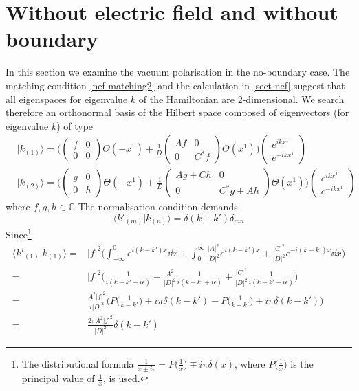 \section{Without electric field and without boundary}
In this section we examine the vacuum polarisation in the no-boundary case.
The matching condition \cref{nef-matching2} and the calculation in \cref{sect-nef} suggest that all eigenspaces for eigenvalue $k$ of the Hamiltonian are 2-dimensional. We search therefore an orthonormal basis of the Hilbert space composed of eigenvectors (for eigenvalue $k$) of type
\begin{equation}
\begin{split}
& | k_{(1)} \rangle = \bigg( \begin{pmatrix} f & 0 \\ 0 & 0 \end{pmatrix}
\Theta(-x^1) + 
\frac{1}{D}\begin{pmatrix} Af & 0 \\  0 & C^* f \end{pmatrix} \Theta(x^1) \bigg)
\begin{pmatrix} e^{ikx^1}  \\ e^{-ikx^1} \end{pmatrix}   \\
& | k_{(2)} \rangle = \bigg( \begin{pmatrix} g& 0 \\ 0 & h \end{pmatrix}
\Theta(-x^1) + 
\frac{1}{D}\begin{pmatrix} Ag + Ch  & 0\\ 0&  C^*g + Ah  \end{pmatrix} \Theta(x^1) \bigg)
\begin{pmatrix} e^{ikx^1}  \\  e^{-ikx^1}  \end{pmatrix}  
\end{split}
\end{equation}
where $f,g,h \in \mathbb{C}$
The normalisation condition demands
\begin{equation}
\langle k'_{(m)} | k_{(n)} \rangle = \delta(k - k') \delta_{mn}
\end{equation}
Since\footnote{
The distributional formula $\frac{1}{x \pm i\epsilon} = P\big(\frac{1}{x}\big) \mp i\pi\delta(x)$, where $P\big(\frac{1}{x}\big)$ is the principal value of $\frac{1}{x}$, is used.}
\begin{equation}
\begin{split}
\langle k'_{(1)} | k_{(1)} \rangle = & |f|^2 \bigg( \int_{-\infty}^0 e^{i(k - k')x} \dd x + \int_0^{\infty}\frac{|A|^2}{|D|^2} e^{i(k-k')x} + \frac{|C|^2}{|D|^2} e^{-i(k - k')x} \dd x \bigg) \\
= & |f|^2 \bigg( \frac{1}{i(k-k' - i\epsilon)} - \frac{A^2}{|D|^2}\frac{1}{i(k-k'+i\epsilon)} + \frac{|C|^2}{|D|^2}\frac{1}{i(k-k'-i\epsilon)} \bigg) \\
= & \frac{A^2 |f|^2}{i |D|^2}\Big( P\big(\frac{1}{k-k'}\big) + i\pi \delta(k-k') - P\big(\frac{1}{k-k'}\big) + i\pi \delta(k-k') \Big) \\
= & \frac{2\pi A^2 |f|^2}{|D|^2} \delta(k-k')
\end{split}
\end{equation}
